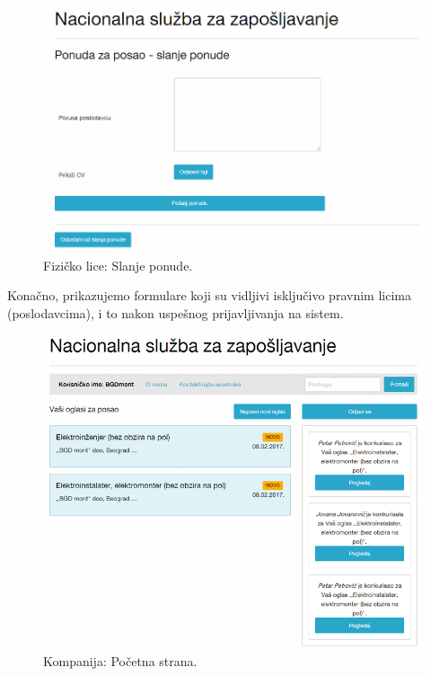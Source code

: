 \begin{figure}[H]
	\centering
	\includegraphics[width=\textwidth]{korisnicki-interfejs/slike/fl-slanjePonude.png}
	\caption{Fizi\v cko lice: Slanje ponude.}
	\label{for: fl-slanjePonude}
\end{figure}

Kona\v cno, prikazujemo formulare koji su vidljivi isklju\v civo pravnim licima (poslodavcima), i to nakon uspe\v snog prijavljivanja na sistem.

\begin{figure}[H]
	\centering
	\includegraphics[width=\textwidth]{korisnicki-interfejs/slike/k-index.png}
	\caption{Kompanija: Po\v cetna strana.}
	\label{for: k-index}
\end{figure}

